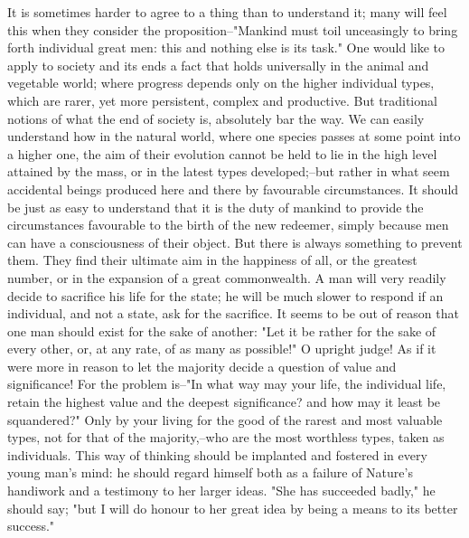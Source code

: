 It is sometimes harder to agree to a thing than to understand it;
many will feel this when they consider the proposition--"Mankind must
toil unceasingly to bring forth individual great men: this and
nothing else is its task." One would like to apply to society and its
ends a fact that holds universally in the animal and vegetable world;
where progress depends only on the higher individual types, which are
rarer, yet more persistent, complex and productive. But traditional
notions of what the end of society is, absolutely bar the way. We can
easily understand how in the natural world, where one species passes
at some point into a higher one, the aim of their evolution cannot be
held to lie in the high level attained by the mass, or in the latest
types developed;--but rather in what seem accidental beings produced
here and there by favourable circumstances. It should be just as easy
to understand that it is the duty of mankind to provide the
circumstances favourable to the birth of the new redeemer, simply
because men can have a consciousness of their object. But there is
always something to prevent them. They find their ultimate aim in the
happiness of all, or the greatest number, or in the expansion of a
great commonwealth. A man will very readily decide to sacrifice his
life for the state; he will be much slower to respond if an
individual, and not a state, ask for the sacrifice. It seems to be
out of reason that one man should exist for the sake of another: "Let
it be rather for the sake of every other, or, at any rate, of as many
as possible!" O upright judge! As if it were more in reason to let
the majority decide a question of value and significance! For the
problem is--"In what way may your life, the individual life, retain
the highest value and the deepest significance? and how may it least
be squandered?" Only by your living for the good of the rarest and
most valuable types, not for that of the majority,--who are the most
worthless types, taken as individuals. This way of thinking should be
implanted and fostered in every young man's mind: he should regard
himself both as a failure of Nature's handiwork and a testimony to
her larger ideas. "She has succeeded badly," he should say; "but I
will do honour to her great idea by being a means to its better
success."

